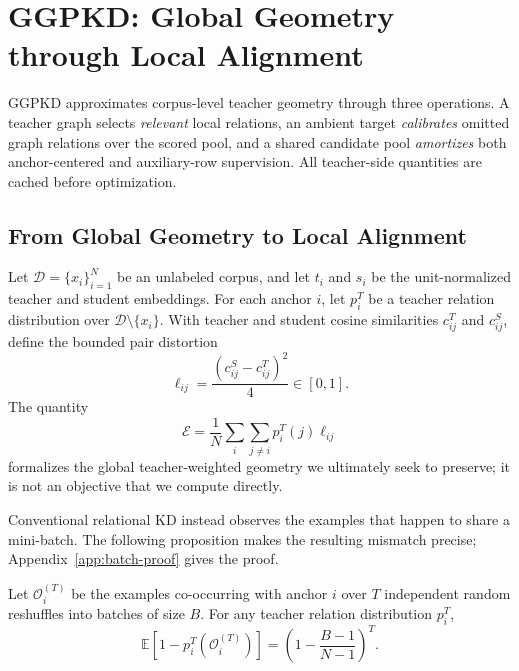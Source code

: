 \section{GGPKD: Global Geometry through Local Alignment}
\label{sec:method}

GGPKD approximates corpus-level teacher geometry through three operations. A teacher graph selects \emph{relevant} local relations, an ambient target \emph{calibrates} omitted graph relations over the scored pool, and a shared candidate pool \emph{amortizes} both anchor-centered and auxiliary-row supervision. All teacher-side quantities are cached before optimization.

\subsection{From Global Geometry to Local Alignment}
\label{sec:relation-selection}

Let $\mathcal D=\{x_i\}_{i=1}^{N}$ be an unlabeled corpus, and let $t_i$ and $s_i$ be the unit-normalized teacher and student embeddings. For each anchor $i$, let $p_i^T$ be a teacher relation distribution over $\mathcal D\setminus\{x_i\}$. With teacher and student cosine similarities $c_{ij}^T$ and $c_{ij}^S$, define the bounded pair distortion
\begin{equation}
\ell_{ij}=\frac{(c_{ij}^S-c_{ij}^T)^2}{4}\in[0,1].
\end{equation}
The quantity
\begin{equation}
\mathcal E
=\frac1N\sum_i\sum_{j\neq i}p_i^T(j)\ell_{ij}
\label{eq:global-distortion}
\end{equation}
formalizes the global teacher-weighted geometry we ultimately seek to preserve; it is not an objective that we compute directly.

Conventional relational KD instead observes the examples that happen to share a mini-batch. The following proposition makes the resulting mismatch precise; Appendix~\ref{app:batch-proof} gives the proof.

\begin{proposition}
\label{prop:batch-exposure}
Let $\mathcal O_i^{(T)}$ be the examples co-occurring with anchor $i$ over $T$ independent random reshuffles into batches of size $B$. For any teacher relation distribution $p_i^T$,
\begin{equation}
\mathbb E\!\left[1-p_i^T(\mathcal O_i^{(T)})\right]
=\left(1-\frac{B-1}{N-1}\right)^T.
\label{eq:batch-exposure}
\end{equation}
\end{proposition}

